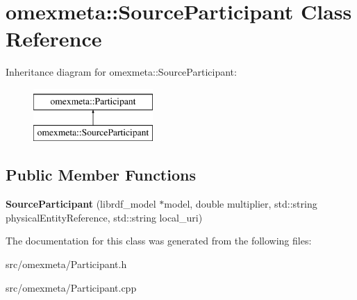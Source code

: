 \hypertarget{classomexmeta_1_1SourceParticipant}{}\section{omexmeta\+:\+:Source\+Participant Class Reference}
\label{classomexmeta_1_1SourceParticipant}
Inheritance diagram for omexmeta\+:\+:Source\+Participant\+:\begin{figure}[H]
\begin{center}
\leavevmode
\includegraphics[height=2.000000cm]{classomexmeta_1_1SourceParticipant}
\end{center}
\end{figure}
\subsection*{Public Member Functions}
\begin{DoxyCompactItemize}
\item 
\mbox{\label{classomexmeta_1_1SourceParticipant_acee76e0800e47bdeb5b3cd76283558c3}} 
{\bfseries Source\+Participant} (librdf\+\_\+model $\ast$model, double multiplier, std\+::string physical\+Entity\+Reference, std\+::string local\+\_\+uri)
\end{DoxyCompactItemize}


The documentation for this class was generated from the following files\+:\begin{DoxyCompactItemize}
\item 
src/omexmeta/Participant.\+h\item 
src/omexmeta/Participant.\+cpp\end{DoxyCompactItemize}
